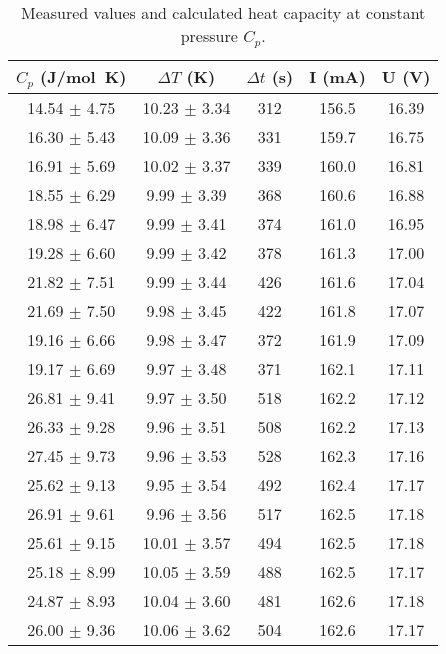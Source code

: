 \begin{table}[H]
  \centering
  \caption{Measured values and calculated heat capacity at constant pressure $C_p$.}
  \label{tab:heat_capacity}
  \begin{tabular}{ccccc}
      \toprule
      $C_p$ (\si{\joule/\mol\kelvin}) & $\Delta T$ (\si{\kelvin}) & $\Delta t$ (\si{\s}) & I (\si{\milli\A}) & U (\si{\V}) \\
      \midrule
      14.54 $\pm$ 4.75 & 10.23 $\pm$ 3.34 & 312 & 156.5 & 16.39 \\
      16.30 $\pm$ 5.43 & 10.09 $\pm$ 3.36 & 331 & 159.7 & 16.75 \\
      16.91 $\pm$ 5.69 & 10.02 $\pm$ 3.37 & 339 & 160.0 & 16.81 \\
      18.55 $\pm$ 6.29 & 9.99  $\pm$ 3.39 & 368 & 160.6 & 16.88 \\
      18.98 $\pm$ 6.47 & 9.99  $\pm$ 3.41 & 374 & 161.0 & 16.95 \\
      19.28 $\pm$ 6.60 & 9.99  $\pm$ 3.42 & 378 & 161.3 & 17.00 \\
      21.82 $\pm$ 7.51 & 9.99  $\pm$ 3.44 & 426 & 161.6 & 17.04 \\
      21.69 $\pm$ 7.50 & 9.98  $\pm$ 3.45 & 422 & 161.8 & 17.07 \\
      19.16 $\pm$ 6.66 & 9.98  $\pm$ 3.47 & 372 & 161.9 & 17.09 \\
      19.17 $\pm$ 6.69 & 9.97  $\pm$ 3.48 & 371 & 162.1 & 17.11 \\
      26.81 $\pm$ 9.41 & 9.97  $\pm$ 3.50 & 518 & 162.2 & 17.12 \\
      26.33 $\pm$ 9.28 & 9.96  $\pm$ 3.51 & 508 & 162.2 & 17.13 \\
      27.45 $\pm$ 9.73 & 9.96  $\pm$ 3.53 & 528 & 162.3 & 17.16 \\
      25.62 $\pm$ 9.13 & 9.95  $\pm$ 3.54 & 492 & 162.4 & 17.17 \\
      26.91 $\pm$ 9.61 & 9.96  $\pm$ 3.56 & 517 & 162.5 & 17.18 \\
      25.61 $\pm$ 9.15 & 10.01 $\pm$ 3.57 & 494 & 162.5 & 17.18 \\
      25.18 $\pm$ 8.99 & 10.05 $\pm$ 3.59 & 488 & 162.5 & 17.17 \\
      24.87 $\pm$ 8.93 & 10.04 $\pm$ 3.60 & 481 & 162.6 & 17.18 \\
      26.00 $\pm$ 9.36 & 10.06 $\pm$ 3.62 & 504 & 162.6 & 17.17 \\
      \bottomrule
  \end{tabular}
\end{table}

